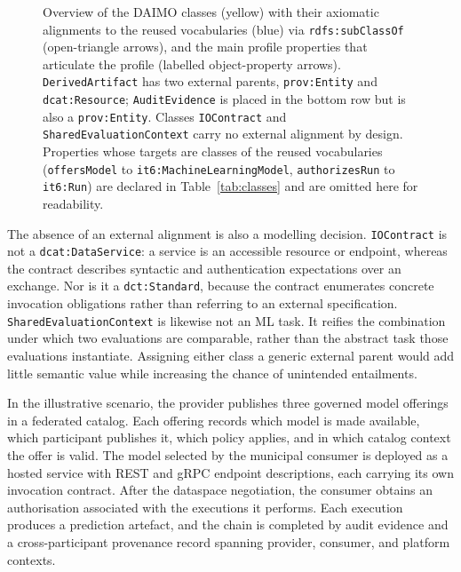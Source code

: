 \documentclass[Afour,sagev,times]{sagej}
\newcommand{\code}[1]{\texttt{#1}}
\begin{document}
\begin{figure}[t]
\caption{Overview of the DAIMO classes (yellow) with their axiomatic alignments to the reused vocabularies (blue) via \code{rdfs:subClassOf} (open-triangle arrows), and the main profile properties that articulate the profile (labelled object-property arrows). \code{DerivedArtifact} has two external parents, \code{prov:Entity} and \code{dcat:Resource}; \code{AuditEvidence} is placed in the bottom row but is also a \code{prov:Entity}. Classes \code{IOContract} and \code{SharedEvaluationContext} carry no external alignment by design. Properties whose targets are classes of the reused vocabularies (\code{offersModel} to \code{it6:MachineLearningModel}, \code{authorizesRun} to \code{it6:Run}) are declared in Table~\ref{tab:classes} and are omitted here for readability.}
\label{fig:classes}
\end{figure}

The absence of an external alignment is also a modelling decision. \code{IOContract} is not a \code{dcat:DataService}: a service is an accessible resource or endpoint, whereas the contract describes syntactic and authentication expectations over an exchange. Nor is it a \code{dct:Standard}, because the contract enumerates concrete invocation obligations rather than referring to an external specification. \code{SharedEvaluationContext} is likewise not an ML task. It reifies the combination under which two evaluations are comparable, rather than the abstract task those evaluations instantiate. Assigning either class a generic external parent would add little semantic value while increasing the chance of unintended entailments.

In the illustrative scenario, the provider publishes three governed model offerings in a federated catalog. Each offering records which model is made available, which participant publishes it, which policy applies, and in which catalog context the offer is valid. The model selected by the municipal consumer is deployed as a hosted service with REST and gRPC endpoint descriptions, each carrying its own invocation contract. After the dataspace negotiation, the consumer obtains an authorisation associated with the executions it performs. Each execution produces a prediction artefact, and the chain is completed by audit evidence and a cross-participant provenance record spanning provider, consumer, and platform contexts.
\end{document}
